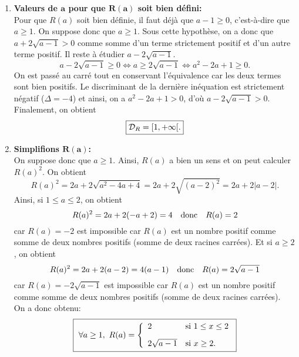 \documentclass[a4paper, 11pt]{article}
\begin{document}
\begin{correction}   \;
\begin{enumerate}
\item \textbf{Valeurs de $\mathbf{a}$ pour que $\mathbf{R(a)}$ soit bien d\'efini:}\\
\noindent Pour que $R(a)$ soit bien d\'efinie, il faut d\'ej\`a que $a-1\geq 0$, c'est-\`a-dire que $a\geq 1$. On suppose donc que $a\geq 1$.
Sous cette hypoth\`ese, on a donc que $a+2\sqrt{a-1}>0$ comme somme d'un terme strictement positif et d'un autre terme positif. Il reste \`a \'etudier $a-2\sqrt{a-1}$.
$$a-2\sqrt{a-1}\geq 0\Leftrightarrow a\geq 2\sqrt{a-1}\Leftrightarrow a^2-2a+1\geq 0.$$
On est pass\'e au carr\'e tout en conservant l'\'equivalence car les deux termes sont bien positifs. Le discriminant de la derni\`ere in\'equation est strictement n\'egatif ($\Delta=-4$) et ainsi, on a $a^2-2a+1>0$, d'o\`u $a-2\sqrt{a-1}>0$. Finalement, on obtient
$$\fbox{$ \mathcal{D}_R=\lbrack 1,+\infty\lbrack. $}$$
\item \textbf{Simplifions $\mathbf{R(a)}$:} \\
\noindent On suppose donc que $a\geq 1$. Ainsi, $R(a)$ a bien un sens et on peut calculer $R(a)^2$. On obtient
$$R(a)^2=2a+2\sqrt{a^2-4a+4}=2a+2\sqrt{(a-2)^2}=2a+2|a-2|.$$
Ainsi, si $1\leq a\leq 2$, on obtient
$$R(a)^2=2a+2(-a+2)=4\quad \hbox{donc}\quad R(a)=2$$
car $R(a)=-2$ est impossible car $R(a)$ est un nombre positif comme somme de deux nombres positifs (somme de deux racines carr\'ees).
Et si $a\geq 2$, on obtient
$$R(a)^2=2a+2(a-2)=4(a-1)\quad \hbox{donc}\quad R(a)=2\sqrt{a-1}$$
car $R(a)=-2\sqrt{a-1}$ est impossible car $R(a)$ est un nombre positif comme somme de deux nombres positifs (somme de deux racines carr\'ees). \\
\noindent On a donc obtenu:
$$\fbox{ $
\forall a\geq 1,\ R(a)=\left\lbrace
\begin{array}{ll}
2 & \hbox{si}\ 1\leq x\leq 2\vsec\\
2\sqrt{a-1} & \hbox{si}\ x\geq 2.
\end{array}
\right.
$}$$


\end{enumerate}
\end{correction}
\end{document}
